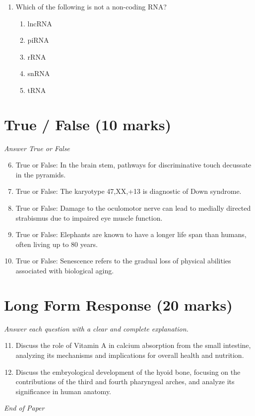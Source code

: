 \documentclass[12pt]{article}
\begin{document}
\begin{enumerate}[label=\arabic*.]
\begin{enumerate}[label=(\alph*)]
    \item 10-15\%
    \item \textgreater{}20\%
    \item \textless{}10\%
    \item \textgreater{}15\%
    \item \textless{}5\%
\end{enumerate}
\item Which of the following is not a non-coding RNA?
\begin{enumerate}[label=(\alph*)]
    \item lncRNA
    \item piRNA
    \item rRNA
    \item snRNA
    \item tRNA
\end{enumerate}
\end{enumerate}

\section*{True / False (10 marks)}
\textit{Answer True or False}
\begin{enumerate}[label=\arabic*.]
\setcounter{enumi}{5}
\item True or False: In the brain stem, pathways for discriminative touch decussate in the pyramids.
\item True or False: The karyotype 47,XX,+13 is diagnostic of Down syndrome.
\item True or False: Damage to the oculomotor nerve can lead to medially directed strabismus due to impaired eye muscle function.
\item True or False: Elephants are known to have a longer life span than humans, often living up to 80 years.
\item True or False: Senescence refers to the gradual loss of physical abilities associated with biological aging.
\end{enumerate}

\section*{Long Form Response (20 marks)}
\textit{Answer each question with a clear and complete explanation.}
\begin{enumerate}[label=\arabic*.]
\setcounter{enumi}{10}
\item Discuss the role of Vitamin A in calcium absorption from the small intestine, analyzing its mechanisms and implications for overall health and nutrition.
\item Discuss the embryological development of the hyoid bone, focusing on the contributions of the third and fourth pharyngeal arches, and analyze its significance in human anatomy.
\end{enumerate}

\vfill
\noindent\textit{End of Paper}
\end{document}
